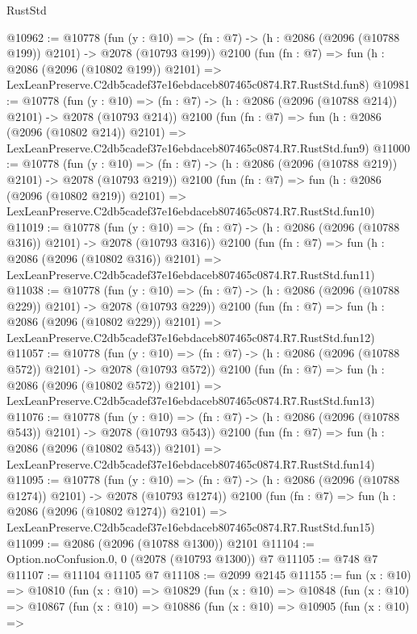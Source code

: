 \begin{lexlean}{RustStd}
\begin{coremodule}
@10962 := @10778
    (fun (y : @10) => (fn : @7) -> (h : @2086 (@2096 (@10788 @199)) @2101) -> @2078 (@10793 @199))
    @2100
    (fun (fn : @7) =>
    fun (h : @2086 (@2096 (@10802 @199)) @2101) =>
    LexLeanPreserve.C2db5cadef37e16ebdaceb807465c0874.R7.RustStd.fun8)
@10981 := @10778
    (fun (y : @10) => (fn : @7) -> (h : @2086 (@2096 (@10788 @214)) @2101) -> @2078 (@10793 @214))
    @2100
    (fun (fn : @7) =>
    fun (h : @2086 (@2096 (@10802 @214)) @2101) =>
    LexLeanPreserve.C2db5cadef37e16ebdaceb807465c0874.R7.RustStd.fun9)
@11000 := @10778
    (fun (y : @10) => (fn : @7) -> (h : @2086 (@2096 (@10788 @219)) @2101) -> @2078 (@10793 @219))
    @2100
    (fun (fn : @7) =>
    fun (h : @2086 (@2096 (@10802 @219)) @2101) =>
    LexLeanPreserve.C2db5cadef37e16ebdaceb807465c0874.R7.RustStd.fun10)
@11019 := @10778
    (fun (y : @10) => (fn : @7) -> (h : @2086 (@2096 (@10788 @316)) @2101) -> @2078 (@10793 @316))
    @2100
    (fun (fn : @7) =>
    fun (h : @2086 (@2096 (@10802 @316)) @2101) =>
    LexLeanPreserve.C2db5cadef37e16ebdaceb807465c0874.R7.RustStd.fun11)
@11038 := @10778
    (fun (y : @10) => (fn : @7) -> (h : @2086 (@2096 (@10788 @229)) @2101) -> @2078 (@10793 @229))
    @2100
    (fun (fn : @7) =>
    fun (h : @2086 (@2096 (@10802 @229)) @2101) =>
    LexLeanPreserve.C2db5cadef37e16ebdaceb807465c0874.R7.RustStd.fun12)
@11057 := @10778
    (fun (y : @10) => (fn : @7) -> (h : @2086 (@2096 (@10788 @572)) @2101) -> @2078 (@10793 @572))
    @2100
    (fun (fn : @7) =>
    fun (h : @2086 (@2096 (@10802 @572)) @2101) =>
    LexLeanPreserve.C2db5cadef37e16ebdaceb807465c0874.R7.RustStd.fun13)
@11076 := @10778
    (fun (y : @10) => (fn : @7) -> (h : @2086 (@2096 (@10788 @543)) @2101) -> @2078 (@10793 @543))
    @2100
    (fun (fn : @7) =>
    fun (h : @2086 (@2096 (@10802 @543)) @2101) =>
    LexLeanPreserve.C2db5cadef37e16ebdaceb807465c0874.R7.RustStd.fun14)
@11095 := @10778
    (fun (y : @10) => (fn : @7) -> (h : @2086 (@2096 (@10788 @1274)) @2101) -> @2078 (@10793 @1274))
    @2100
    (fun (fn : @7) =>
    fun (h : @2086 (@2096 (@10802 @1274)) @2101) =>
    LexLeanPreserve.C2db5cadef37e16ebdaceb807465c0874.R7.RustStd.fun15)
@11099 := @2086 (@2096 (@10788 @1300)) @2101
@11104 := Option.noConfusion.{0, 0} (@2078 (@10793 @1300)) @7
@11105 := @748 @7
@11107 := @11104 @11105 @7
@11108 := @2099 @2145
@11155 := fun (x : @10) =>
  @10810
    (fun (x : @10) =>
    @10829
      (fun (x : @10) =>
      @10848
        (fun (x : @10) =>
        @10867
          (fun (x : @10) =>
          @10886
            (fun (x : @10) =>
            @10905
              (fun (x : @10) =>

\end{coremodule}
\end{lexlean}
